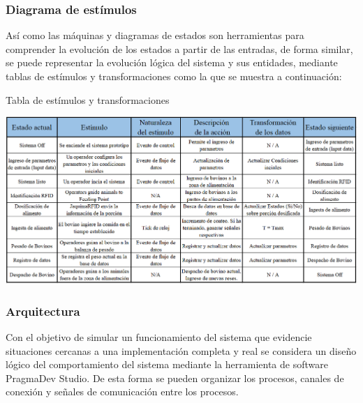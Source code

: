 
\subsubsection{Diagrama de estímulos}
Así como las máquinas y diagramas de estados son herramientas para comprender la evolución de los estados a partir de las entradas,
de forma similar, se puede representar la evolución lógica del sistema y sus entidades, mediante tablas de estímulos y transformaciones como la que se muestra a continuación:
\begin{table}[H]
    \centering
    \caption{Tabla de estímulos y transformaciones}
    \includegraphics[scale=0.60]{img/estimulos.png}
\end{table}



\subsubsection{Arquitectura}

Con el objetivo de simular un funcionamiento del sistema que evidencie situaciones cercanas a una implementación completa y real se considera un diseño lógico del comportamiento del sistema mediante la herramienta de software PragmaDev Studio. De esta forma se pueden organizar los procesos, canales de conexión y señales de comunicación entre los procesos.


